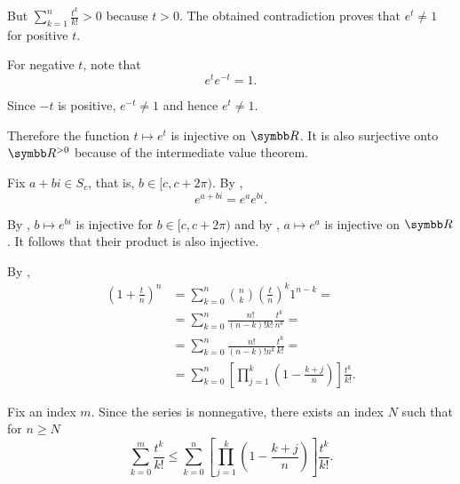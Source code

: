 \begin{RefListProof}
    But \( \sum_{k=1}^n \frac {t^k} {k!} > 0 \) because \( t > 0 \). The obtained contradiction proves that \( e^t \neq 1 \) for positive \( t \).

    For negative \( t \), note that
    \begin{equation*}
      e^t e^{-t} = 1.
    \end{equation*}

    Since \( -t \) is positive, \( e^{-t} \neq 1 \) and hence \( e^t \neq 1 \).

    Therefore the function \( t \mapsto e^t \) is injective on \( \BR \). It is also surjective onto \( \BR^{>0} \) because of the intermediate value theorem.

     Fix \( a + bi \in S_c \), that is, \( b \in [c, c + 2\pi) \). By ,
    \begin{equation*}
      e^{a + bi} = e^a e^{bi}.
    \end{equation*}

    By , \( b \mapsto e^{bi} \) is injective for \( b \in [c, c + 2\pi) \) and by , \( a \mapsto e^a \) is injective on \( \BR \). It follows that their product is also injective.

    \cite[3.31]{Rudin1976} By ,
    \begin{align*}
      \left(1 + \frac t n \right)^n
      &=
      \sum_{k=0}^n \binom{n}{k} \left(\frac t n\right)^k 1^{n-k}
      = \\ &=
      \sum_{k=0}^n \frac {n!} {(n-k)! k!} \frac {t^k} {n^k}
      = \\ &=
      \sum_{k=0}^n \frac {n!} {(n-k)! n^k} \frac {t^k} {k!}
      = \\ &=
      \sum_{k=0}^n \left[ \prod_{j=1}^k \left(1 - \frac {k+j} n \right) \right] \frac {t^k} {k!}.
    \end{align*}

    Fix an index \( m \). Since the series is nonnegative, there exists an index \( N \) such that for \( n \geq N \)
    \begin{equation*}
      \sum_{k=0}^m \frac {t^k} {k!}
      \leq
      \sum_{k=0}^n \left[ \prod_{j=1}^k \left(1 - \frac {k+j} n \right) \right] \frac {t^k} {k!}.
    \end{equation*}


\end{RefListProof}
